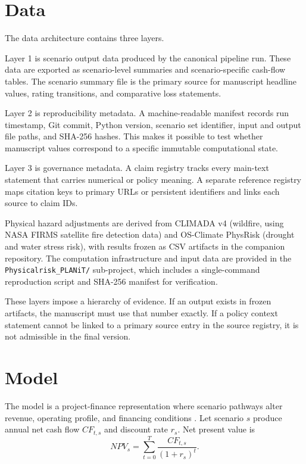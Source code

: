 \documentclass[preprint,12pt]{elsarticle}
\begin{document}
\section{Data}
The data architecture contains three layers.

Layer 1 is scenario output data produced by the canonical pipeline run. These data are exported as scenario-level summaries and scenario-specific cash-flow tables. The scenario summary file is the primary source for manuscript headline values, rating transitions, and comparative loss statements.

Layer 2 is reproducibility metadata. A machine-readable manifest records run timestamp, Git commit, Python version, scenario set identifier, input and output file paths, and SHA-256 hashes. This makes it possible to test whether manuscript values correspond to a specific immutable computational state.

Layer 3 is governance metadata. A claim registry tracks every main-text statement that carries numerical or policy meaning. A separate reference registry maps citation keys to primary URLs or persistent identifiers and links each source to claim IDs.

Physical hazard adjustments are derived from CLIMADA v4 (wildfire, using NASA FIRMS satellite fire detection data) and OS-Climate PhysRisk (drought and water stress risk), with results frozen as CSV artifacts in the companion repository. The computation infrastructure and input data are provided in the \texttt{Physicalrisk\_PLANiT/} sub-project, which includes a single-command reproduction script and SHA-256 manifest for verification.

These layers impose a hierarchy of evidence. If an output exists in frozen artifacts, the manuscript must use that number exactly. If a policy context statement cannot be linked to a primary source entry in the source registry, it is not admissible in the final version.

\section{Model}
The model is a project-finance representation where scenario pathways alter revenue, operating profile, and financing conditions \citep{yescombe2014principles,esty2004large}. Let scenario $s$ produce annual net cash flow $CF_{t,s}$ and discount rate $r_s$. Net present value is
\begin{equation}
NPV_s = \sum_{t=0}^{T} \frac{CF_{t,s}}{(1+r_s)^t}.
\end{equation}
\end{document}
